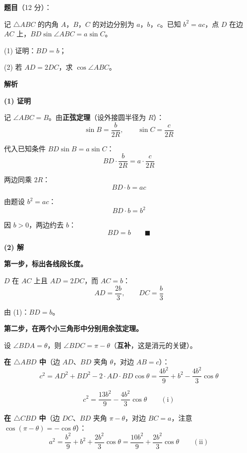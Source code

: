 \begin{answer}

\textbf{题目}（12 分）：

记 $\triangle ABC$ 的内角 $A$，$B$，$C$ 的对边分别为 $a$，$b$，$c$。已知 $b^{2}=ac$，点 $D$ 在边 $AC$ 上，$BD\sin\angle ABC=a\sin C$。

  (1) 证明：$BD=b$；

  (2) 若 $AD=2DC$，求 $\cos\angle ABC$。

\textbf{解析}

\par\medskip

\textbf{(1) 证明}

记 $\angle ABC=B$。由\textbf{正弦定理}（设外接圆半径为 $R$）：
\nopagebreak[4]
\[\sin B=\frac b{2R},\qquad \sin C=\frac c{2R}\]

代入已知条件 $BD\sin B=a\sin C$：
\nopagebreak[4]
\[BD\cdot\frac b{2R}=a\cdot\frac c{2R}\]

两边同乘 $2R$：
\nopagebreak[4]
\[BD\cdot b=ac\]

由题设 $b^{2}=ac$：
\nopagebreak[4]
\[BD\cdot b=b^{2}\]

因 $b>0$，两边约去 $b$：
\nopagebreak[4]
\[BD=b\qquad\blacksquare\]

\par\medskip

\textbf{(2) 解}

\textbf{第一步，标出各线段长度。}

$D$ 在 $AC$ 上且 $AD=2DC$，而 $AC=b$：
\nopagebreak[4]
\[AD=\frac{2b}3,\qquad DC=\frac b3\]

由 (1)：$BD=b$。

\textbf{第二步，在两个小三角形中分别用余弦定理。}

设 $\angle BDA=\theta$，则 $\angle BDC=\pi-\theta$（\textbf{互补}，这是消元的关键）。

\textbf{在 $\triangle ABD$ 中}（边 $AD$、$BD$ 夹角 $\theta$，对边 $AB=c$）：
\nopagebreak[4]
\[c^{2}=AD^{2}+BD^{2}-2\cdot AD\cdot BD\cos\theta=\frac{4b^{2}}9+b^{2}-\frac{4b^{2}}3\cos\theta\]

\nopagebreak[4]
\[c^{2}=\frac{13b^{2}}9-\frac{4b^{2}}3\cos\theta\qquad(\text{i})\]

\textbf{在 $\triangle CBD$ 中}（边 $DC$、$BD$ 夹角 $\pi-\theta$，对边 $BC=a$，注意 $\cos(\pi-\theta)=-\cos\theta$）：
\nopagebreak[4]
\[a^{2}=\frac{b^{2}}9+b^{2}+\frac{2b^{2}}3\cos\theta=\frac{10b^{2}}9+\frac{2b^{2}}3\cos\theta\qquad(\text{ii})\]


\end{answer}

